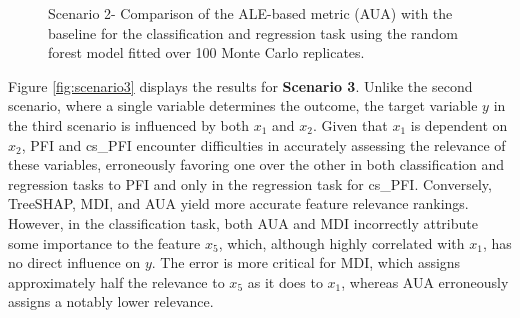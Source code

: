 \begin{figure}[ht!]
\centering
  \caption{Scenario 2- Comparison of the ALE-based metric (AUA) with the baseline for the classification and regression task using the random forest model fitted over 100 Monte Carlo replicates.}
    \label{fig:scenario2}
\end{figure}

Figure \ref{fig:scenario3} displays the results for \textbf{Scenario 3}. Unlike the second scenario, where a single variable determines the outcome, the target variable \(y\) in the third scenario is influenced by both \(x_1\) and \(x_2\). Given that \(x_1\) is dependent on \(x_2\), PFI and cs\_PFI encounter difficulties in accurately assessing the relevance of these variables, erroneously favoring one over the other in both classification and regression tasks to PFI and only in the regression task for cs\_PFI. Conversely, TreeSHAP, MDI, and AUA yield more accurate feature relevance rankings. However, in the classification task, both AUA and MDI incorrectly attribute some importance to the feature \(x_5\), which, although highly correlated with \(x_1\), has no direct influence on \(y\). The error is more critical for MDI, which assigns approximately half the relevance to \(x_5\) as it does to \(x_1\), whereas AUA erroneously assigns a notably lower relevance.


